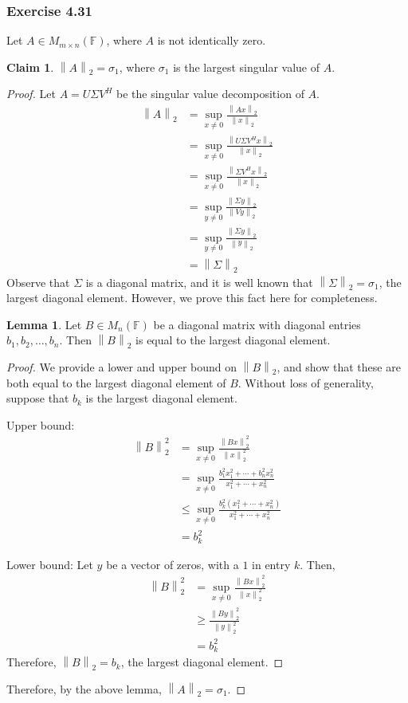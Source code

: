 \documentclass[letterpaper,12pt]{article}
\theoremstyle{definition}
\newtheorem{claim}[theorem]{Claim}
\newtheorem{lemma}[theorem]{Lemma}
\newcommand{\norm}[1]{\left\lVert#1\right\rVert}
\begin{document}
\subsubsection*{Exercise 4.31}
Let $A \in M_{m \times n} (\mathbb{F})$, where $A$ is not identically zero.
\begin{claim}
	$\norm{A}_2 = \sigma_1$, where $\sigma_1$ is the largest singular value of $A$.
\end{claim}
\begin{proof}
Let $A = U \Sigma V^H$ be the singular value decomposition of $A$.
	\begin{align*}
	\norm{A}_2 &= \sup_{x\neq 0} \frac{\norm{Ax}_2}{\norm{x}_2} \\
	&= \sup_{x\neq 0} \frac{\norm{U \Sigma V^H x}_2}{\norm{x}_2} \\
	&=  \sup_{x\neq 0} \frac{\norm{\Sigma V^H x}_2}{\norm{x}_2} \tag{because $U$ orthonormal} \\
	&=  \sup_{y\neq 0} \frac{\norm{\Sigma y}_2}{\norm{Vy}_2} \tag{change of variables} \\
	&= \sup_{y\neq 0} \frac{\norm{\Sigma y}_2}{\norm{y}_2} \tag{because $V$ orthonormal} \\
	&= \norm{\Sigma}_2
	\end{align*}
	Observe that $\Sigma$ is a diagonal matrix, and it is well known that $\norm{\Sigma}_2 = \sigma_1$, the largest diagonal element. However, we prove this fact here for completeness. 
	\begin{lemma}
	Let $B \in M_n(\mathbb{F})$ be a diagonal matrix with diagonal entries $b_1, b_2, \ldots, b_n$. Then $\norm{B}_2$ is equal to the largest diagonal element.
	\begin{proof}
		We provide a lower and upper bound on $\norm{B}_2$, and show that these are both equal to the largest diagonal element of $B$. Without loss of generality, suppose that $b_k$ is the largest diagonal element.  
		
		Upper bound: 
		\begin{align*}
		\norm{B}^2_2 &= \sup_{x\neq 0} \frac{\norm{Bx}^2_2}{\norm{x}^2_2} \\
		&=  \sup_{x\neq 0} \frac{b_1^2x^2_1 + \cdots + b^2_n x^2_n}{x^2_1 + \cdots + x^2_n} \\
		&\leq \sup_{x\neq 0} \frac{b^2_k (x^2_1 + \cdots + x^2_n)}{x^2_1 + \cdots + x^2_n} \\
		&= b^2_k
		\end{align*}
		
		Lower bound: Let $y$ be a vector of zeros, with a $1$ in entry $k$. Then, 
		\begin{align*}
		\norm{B}^2_2 &= \sup_{x\neq 0} \frac{\norm{Bx}^2_2}{\norm{x}^2_2} \\
		&\geq \frac{\norm{By}^2_2}{\norm{y}^2_2} \\
		&= b^2_k
		\end{align*}
		Therefore, $\norm{B}_2 = b_k$, the largest diagonal element. 
	\end{proof}
	\end{lemma}
	
	Therefore, by the above lemma, $\norm{A}_2 = \sigma_1$.
\end{proof}
\end{document}
